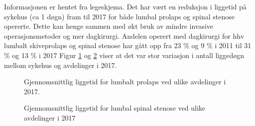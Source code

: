\documentclass [norsk,a4paper,twoside]{article}\usepackage[]{graphicx}\usepackage[]{color}
\begin{document}
Informasjonen er hentet fra legeskjema.
Det har vært en reduksjon i liggetid  på sykehus (ca 1 døgn) fram til 2017 for både lumbal prolaps og spinal stenose opererte. 
Dette kan henge sammen med økt bruk av mindre invasive operasjonsmetoder og mer dagkirurgi. 
Andelen operert med dagkirurgi for hhv lumbalt skiveprolaps og spinal stenose har gått opp fra 
23 \% og 9 \%  i 2011 til 31 \% og 13 \%  i 2017  
Figur \ref{fig:LiggetidAvdPro} og \ref{fig:LiggetidAvdSS} viser at det var stor variasjon i antall liggedøgn mellom sykehus og avdelinger i 2017.


      
      
      


\begin{figure}[h] 
\caption{Gjennomsnittlig liggetid for lumbalt prolaps ved ulike avdelinger i 2017. } 
\label{fig:LiggetidAvdPro}
\end{figure}

\begin{figure}[h] 
\caption{Gjennomsnittlig liggetid for lumbal spinal stenose ved ulike avdelinger i 2017 } 
\label{fig:LiggetidAvdSS}
\end{figure}


      
      
      
      
      \clearpage
\end{document}
